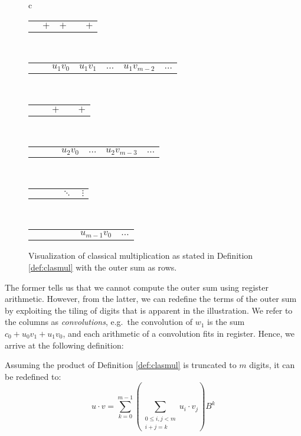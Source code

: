 \begin{figure}
\begin{tabular}{c}
    \begin{tabular}{C{0.8cm}C{0.8cm}C{0.8cm}C{0.5cm}C{0.8cm}}
       & $+$ & $+$ &  & $+$
    \end{tabular}\\[-0.5ex]
    \begin{tabular}{C{0cm}C{0.8cm}C{0.8cm}C{0.8cm}C{0.5cm}C{0.8cm}C{0cm}}
       & & $u_1v_0$ & $u_1v_1$ & $\ldots$ & $u_1v_{m-2}$ & $\ldots$
    \end{tabular}\\[-0.5ex]
    \begin{tabular}{C{0.8cm}C{0.8cm}C{0.8cm}C{0.5cm}C{0.8cm}}
       & & $+$ &  & $+$
    \end{tabular}\\[-0.5ex]
    \begin{tabular}{C{0cm}C{0.8cm}C{0.8cm}C{0.8cm}C{0.5cm}C{0.8cm}C{0cm}}
       & & & $u_2v_0$ & $\ldots$ & $u_2v_{m-3}$ & $\ldots$
    \end{tabular}\\[-0.6ex]
    \begin{tabular}{C{0.8cm}C{0.8cm}C{0.8cm}C{0.5cm}C{0.8cm}}
       & & & $\ddots$ & $\vdots$
    \end{tabular}\\[-0.6ex]
    \begin{tabular}{C{0cm}C{0.8cm}C{0.8cm}C{0.8cm}C{0.5cm}C{0.8cm}C{0cm}}
       & & & & & $u_{m-1}v_0$ & $\ldots$
    \end{tabular}
  \end{tabular}
  \caption{\footnotesize Visualization of classical multiplication as stated in Definition \ref{def:clasmul} with the outer sum as rows.}
  \label{fig:tiledmult}
\end{figure}

The former tells us that we cannot compute the outer sum using register
arithmetic. However, from the latter, we can redefine the terms of the outer sum
by exploiting the tiling of digits that is apparent in the illustration. We
refer to the columns as \textit{convolutions}, e.g.\ the convolution of $w_1$ is
the sum $c_0+u_0v_1+u_1v_0$, and each arithmetic of a convolution fits in
register. Hence, we arrive at the following definition:

\begin{definition}\label{def:clasmultil}
  Assuming the product of Definition \ref{def:clasmul} is truncated to $m$
  digits, it can be redefined to:
\begin{equation}
\label{eq:clasmul}
u \cdot v = \sum_{k=0}^{m-1} \left( \sum_{\substack{0\leq i,j < m\\i+j=k}}u_i\cdot v_j \right)B^{k}
\end{equation}
\end{definition}
\bigskip

